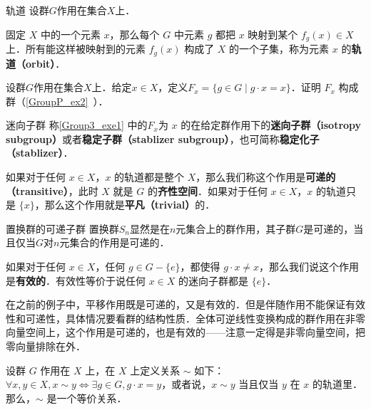 \begin{definition}{轨道}
设群$G$作用在集合$X$上．

固定 $X$ 中的一个元素 $x$，那么每个 $G$ 中元素 $g$ 都把 $x$ 映射到某个 $f_g(x)\in X$ 上．所有能这样被映射到的元素 $f_g(x)$ 构成了 $X$ 的一个子集，称为元素 $x$ 的\textbf{轨道（orbit）}．
\end{definition}









\begin{exercise}{}\label{Group3_exe1}
设群$G$作用在集合$X$上．给定$x\in X$，定义$F_x=\{g\in G\mid g\cdot x=x\}$．证明 $F_x$ 构成群（\autoref{GroupP_ex2}~）．
\end{exercise}




\begin{definition}{迷向子群}
称\autoref{Group3_exe1} 中的$F_x$为 $x$ 的在给定群作用下的\textbf{迷向子群（isotropy subgroup）}或者\textbf{稳定子群（stablizer subgroup）}，也可简称\textbf{稳定化子（stablizer）}．
\end{definition}






\begin{definition}{}
如果对于任何 $x\in X$，$x$ 的轨道都是整个 $X$，那么我们称这个作用是\textbf{可递的（transitive）}，此时 $X$ 就是 $G$ 的\textbf{齐性空间}．如果对于任何 $x\in X$，$x$ 的轨道只是 $\{x\}$，那么这个作用就是\textbf{平凡（trivial）}的．
\end{definition}

\begin{example}{置换群的可递子群}\label{Group3_ex4}
置换群$S_n$显然是在$n$元集合上的群作用，其子群$G$是可递的，当且仅当$G$对$n$元集合的作用是可递的．
\end{example}

如果对于任何 $x\in X$，任何 $g\in G-\{e\}$，都使得 $g\cdot x\not=x$，那么我们说这个作用是\textbf{有效的}．有效性等价于说任何 $x\in X$ 的迷向子群都是 $\{e\}$．

在之前的例子中，平移作用既是可递的，又是有效的．但是伴随作用不能保证有效性和可递性，具体情况要看群的结构性质．全体可逆线性变换构成的群作用在非零向量空间上，这个作用是可递的，也是有效的——注意一定得是非零向量空间，把零向量排除在外．

\begin{theorem}{}\label{Group3_the1}
设群 $G$ 作用在 $X$ 上，在 $X$ 上定义关系 $\sim$ 如下：$\forall x, y\in X, x\sim y \iff \exists g\in G, g\cdot x=y$，或者说，$x\sim y$ 当且仅当 $y$ 在 $x$ 的轨道里．那么，$\sim$ 是一个等价关系．
\end{theorem}

